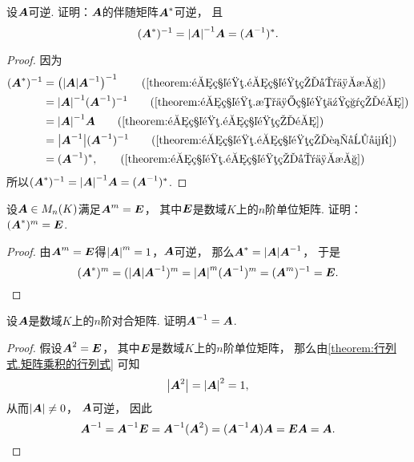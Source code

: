 \begin{example}\label{theorem:逆矩阵.伴随矩阵的逆与逆矩阵的伴随}
设\(\boldsymbol{A}\)可逆.
证明：\(\boldsymbol{A}\)的伴随矩阵\(\boldsymbol{A}^*\)可逆，
且\begin{equation}
	(\boldsymbol{A}^*)^{-1}
	= \abs{\boldsymbol{A}}^{-1} \boldsymbol{A}
	= (\boldsymbol{A}^{-1})^*.
\end{equation}
\begin{proof}
因为\begin{align*}
	(\vb{A}^*)^{-1}
	&= \left( \abs{\vb{A}} \vb{A}^{-1} \right)^{-1}
		\tag{\cref{theorem:逆矩阵.逆矩阵的唯一性}} \\
	&= \abs{\vb{A}}^{-1} (\vb{A}^{-1})^{-1}
		\tag{\cref{theorem:逆矩阵.数与矩阵乘积的逆}} \\
	&= \abs{\vb{A}}^{-1} \vb{A}
		\tag{\cref{theorem:逆矩阵.逆矩阵的逆}} \\
	&= \abs{\vb{A}^{-1}} (\vb{A}^{-1})^{-1}
		\tag{\cref{theorem:逆矩阵.逆矩阵的行列式}} \\
	&= (\vb{A}^{-1})^*,
		\tag{\cref{theorem:逆矩阵.逆矩阵的唯一性}}
\end{align*}
所以\((\boldsymbol{A}^*)^{-1}
= \abs{\boldsymbol{A}}^{-1} \boldsymbol{A}
= (\boldsymbol{A}^{-1})^*\).
\end{proof}
\end{example}
\begin{example}
设\(\boldsymbol{A} \in M_n(K)\)满足\(\boldsymbol{A}^m = \boldsymbol{E}\)，
其中\(\boldsymbol{E}\)是数域\(K\)上的\(n\)阶单位矩阵.
证明：\((\boldsymbol{A}^*)^m = \boldsymbol{E}\).
\begin{proof}
由\(\boldsymbol{A}^m = \boldsymbol{E}\)得\(\abs{\boldsymbol{A}}^m = 1\)，\(\boldsymbol{A}\)可逆，
那么\(\boldsymbol{A}^* = \abs{\boldsymbol{A}} \boldsymbol{A}^{-1}\)，
于是\begin{equation*}
	(\boldsymbol{A}^*)^m
	= (\abs{\boldsymbol{A}} \boldsymbol{A}^{-1})^m
	= \abs{\boldsymbol{A}}^m (\boldsymbol{A}^{-1})^m
	= (\boldsymbol{A}^m)^{-1}
	= \boldsymbol{E}.
	\qedhere
\end{equation*}
\end{proof}
\end{example}

\begin{example}\label{example:对合矩阵.对合矩阵的逆矩阵}
设\(\boldsymbol{A}\)是数域\(K\)上的\(n\)阶对合矩阵.
证明\(\boldsymbol{A}^{-1} = \boldsymbol{A}\).
\begin{proof}
假设\(\boldsymbol{A}^2=\boldsymbol{E}\)，
其中\(\boldsymbol{E}\)是数域\(K\)上的\(n\)阶单位矩阵，
那么由\cref{theorem:行列式.矩阵乘积的行列式} 可知\begin{equation*}
	\abs{\boldsymbol{A}^2}
	= \abs{\boldsymbol{A}}^2
	= 1,
\end{equation*}
从而\(\abs{\boldsymbol{A}}\neq0\)，
\(\boldsymbol{A}\)可逆，
因此\begin{equation*}
	\boldsymbol{A}^{-1}
	= \boldsymbol{A}^{-1}\boldsymbol{E}
	= \boldsymbol{A}^{-1}(\boldsymbol{A}^2)
	= (\boldsymbol{A}^{-1}\boldsymbol{A})\boldsymbol{A}
	= \boldsymbol{E}\boldsymbol{A}
	= \boldsymbol{A}.
	\qedhere
\end{equation*}
\end{proof}
\end{example}

